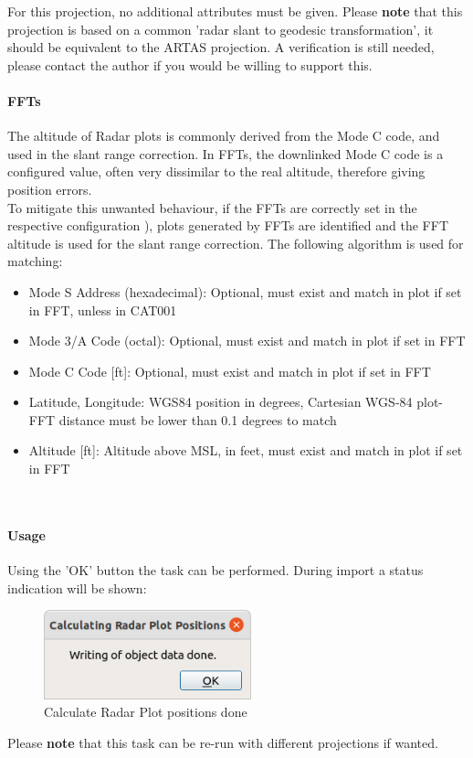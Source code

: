 For this projection, no additional attributes must be given. Please \textbf{note} that this projection is based on a common 'radar slant to geodesic transformation', it should be equivalent to the ARTAS projection. A verification is still needed, please contact the author if you would be willing to support this.

\paragraph{FFTs}

The altitude of Radar plots is commonly derived from the Mode C code, and used in the slant range correction. In FFTs, the downlinked Mode C code is a configured value, often very dissimilar to the real altitude, therefore giving position errors. \\

To mitigate this unwanted behaviour, if the FFTs are correctly set in the respective configuration ), plots generated by FFTs are identified and the FFT altitude is used for the slant range correction. The following algorithm is used for matching:

\begin{itemize}
\item Mode S Address (hexadecimal): Optional, must exist and match in plot if set in FFT, unless in CAT001
\item Mode 3/A Code (octal): Optional, must exist and match in plot if set in FFT
\item Mode C Code [ft]: Optional, must exist and match in plot if set in FFT
\item Latitude, Longitude: WGS84 position in degrees, Cartesian WGS-84 plot-FFT distance must be lower than 0.1 degrees to match
\item Altitude [ft]: Altitude above MSL, in feet, must exist and match in plot if set in FFT
\end{itemize}
\ \\

\paragraph{Usage}

Using the 'OK' button the task can be performed. During import a status indication will be shown:

\begin{figure}[H]
  \center
    \includegraphics[width=6cm]{figures/proc_calc_radar_done.png}
  \caption{Calculate Radar Plot positions done}
\end{figure}

Please \textbf{note} that this task can be re-run with different projections if wanted.

